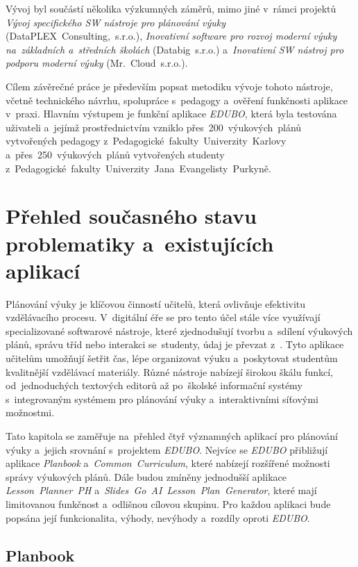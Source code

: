 \documentclass[male,czech,api_bc]{kitheses}
\begin{document}
Vývoj byl součástí několika výzkumných záměrů, mimo jiné v~rámci projektů \textit{Vývoj specifického SW nástroje pro plánování výuky} (DataPLEX~Consulting,~s.r.o.), \textit{Inovativní software pro rozvoj moderní výuky na~základních a~středních školách} (Databig~s.r.o.) a~\textit{Inovativní SW nástroj pro podporu moderní výuky} (Mr.~Cloud~s.r.o.).

\newpage

Cílem závěrečné práce je především popsat metodiku vývoje tohoto nástroje, včetně technického návrhu, spolupráce s~pedagogy a~ověření funkčnosti aplikace v~praxi. Hlavním výstupem je funkční aplikace \textit{EDUBO}, která byla testována uživateli a~jejímž prostřednictvím vzniklo přes~200~výukových~plánů vytvořených pedagogy z~Pedagogické~fakulty~Univerzity~Karlovy a~přes~250~výukových~plánů vytvořených studenty z~Pedagogické~fakulty~Univerzity~Jana~Evangelisty~Purkyně.

\chapter{Přehled současného stavu problematiky a~existujících aplikací}

Plánování výuky je klíčovou činností učitelů, která ovlivňuje efektivitu vzdělávacího procesu. V~digitální éře se pro tento účel stále více využívají specializované softwarové nástroje, které zjednodušují tvorbu a~sdílení výukových plánů, správu tříd nebo interakci se~studenty, údaj je převzat z~\cite{UnescoIIEP}. Tyto aplikace učitelům umožňují šetřit čas, lépe organizovat výuku a~poskytovat studentům kvalitnější vzdělávací materiály. Různé nástroje nabízejí širokou škálu funkcí, od~jednoduchých textových editorů až po~školské informační systémy s~integrovaným systémem pro plánování výuky a~interaktivními síťovými možnostmi.

Tato kapitola se zaměřuje na~přehled čtyř významných aplikací pro plánování výuky a~jejich srovnání s~projektem \textit{EDUBO}. Nejvíce se \textit{EDUBO} přibližují aplikace \textit{Planbook} a~\textit{Common~Curriculum}, které nabízejí rozšířené možnosti správy výukových plánů. Dále budou zmíněny jednodušší aplikace \textit{Lesson~Planner~PH} a~\textit{Slides~Go~AI~Lesson~Plan~Generator}, které mají limitovanou funkčnost a~odlišnou cílovou skupinu. Pro každou aplikaci bude popsána její funkcionalita, výhody, nevýhody a~rozdíly oproti \textit{EDUBO}.

\section{Planbook}
\end{document}
